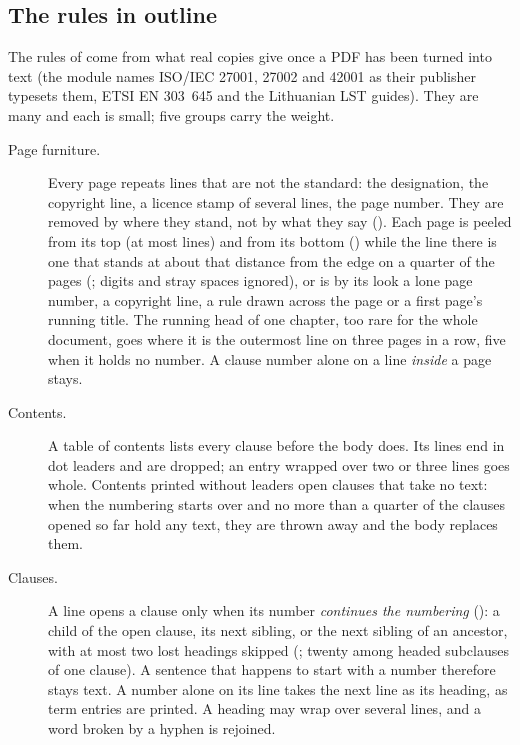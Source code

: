 \subsection{The rules in outline}\label{sec:corpus:rules}

The rules of  come from what real copies give once a PDF has been
turned into text (the module
names ISO/IEC 27001, 27002 and 42001 as their publisher typesets them, ETSI EN 303~645 and
the Lithuanian LST guides). They are many and each is small; five groups carry the weight.

\begin{description}
  \item[Page furniture.] Every page repeats lines that are not the standard: the designation,
    the copyright line, a licence stamp of several lines, the page number. They are removed
    by where they stand, not by what they say (). Each page is
    peeled from its top (at most  lines) and from its bottom
    () while the line there is one that stands at about that distance
    from the edge on a quarter of the pages (; digits and stray spaces
    ignored), or is by its look a lone page number, a copyright line, a rule drawn across the
    page or a first page's running title. The running head of one chapter, too rare for the
    whole document, goes where it is the outermost line on three pages in a row, five when it
    holds no number. A clause number alone on a line \emph{inside} a page stays.
  \item[Contents.] A table of contents lists every clause before the body does. Its lines end
    in dot leaders and are dropped; an entry wrapped over two or three lines goes whole.
    Contents printed without leaders open clauses that take no text: when the numbering starts
    over and no more than a quarter of the clauses opened so far hold any text, they are
    thrown away and the body replaces them.
  \item[Clauses.] A line opens a clause only when its number \emph{continues the numbering}
    (): a child of the open clause, its next sibling, or the next sibling of
    an ancestor, with at most two lost headings skipped (; twenty among headed
    subclauses of one clause). A sentence that happens to start with a number therefore stays
    text. A number alone on its line takes the next line as its heading, as term entries are
    printed. A heading may wrap over several lines, and a word broken by a hyphen is rejoined.

\end{description}
